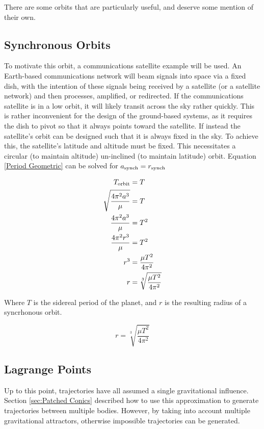 \documentclass[../basicOrbitalDynamics.tex]{subfiles}
\begin{document}
There are some orbits that are particularly useful, and deserve some mention of their own.

\bigskip\bigskip
\subsection{Synchronous Orbits}\label{Synchronous Orbits}

To motivate this orbit, a communications satellite example will be used. An Earth-based communications network will beam signals into space via a fixed dish, with the intention of these signals being received by a satellite (or a satellite network) and then processes, amplified, or redirected. If the communications satellite is in a low orbit, it will likely transit across the sky rather quickly. This is rather inconvenient for the design of the ground-based systems, as it requires the dish to pivot so that it always points toward the satellite. If instead the satellite's orbit can be designed such that it is always fixed in the sky. To achieve this, the satellite's latitude and altitude must be fixed. This necessitates a circular (to maintain altitude) un-inclined (to maintain latitude) orbit. Equation  \eqref{Period Geometric} can be solved for ${a}_\text{synch}={r}_\text{synch}$

\begin{align*}
    {T}_\text{orbit}& = T  \\
    \sqrt{\frac{4\pi^2 a^3}{\mu}} & = T  \\
    \frac{4\pi^2 a^3}{\mu} & = T^2\\
    \frac{4\pi^2 r^3}{\mu} & = T^2\\
    r^3& = \frac{\mu T^2}{4\pi^2} \\
    r  & = \sqrt[3]{\frac{\mu T^2}{4\pi^2}} \\
\end{align*}

Where $T$ is the sidereal period of the planet, and $r$ is the resulting radius of a syncrhonous orbit.

\begin{equation}\label{Syncrhonous Orbit}
    r = \sqrt[3]{\frac{\mu T^2}{4\pi^2}}
\end{equation}

\bigskip\bigskip
\subsection{Lagrange Points}\label{sec:Lagrange Points}

Up to this point, trajectories have all assumed a single gravitational influence. Section \ref{sec:Patched Conics} described how to use this approximation to generate trajectories between multiple bodies. However, by taking into account multiple gravitational attractors, otherwise impossible trajectories can be generated.
\end{document}
